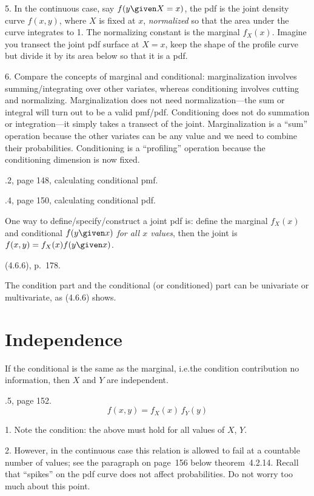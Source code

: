 \documentclass[12pt]{article}
\begin{document}
5. In the continuous case, say $f(y \given X=x)$,
the pdf is the joint density curve $f(x, y)$, where $X$ is fixed at $x$,
\emph{normalized} so that the area under the curve integrates to 1.
The normalizing constant is the marginal $f_X(x)$.
Imagine you transect the joint pdf surface at $X=x$,
keep the shape of the profile curve but divide it by its area below
so that it is a pdf.

6. Compare the concepts of marginal and conditional:
marginalization involves summing/integrating over other variates,
whereas
conditioning involves cutting and normalizing.
Marginalization does not need normalization---the sum or integral will
turn out to be a valid pmf/pdf.
Conditioning does not do summation or integration---it simply takes a
transect of the joint.
Marginalization is a ``sum'' operation because the other variates can be
any value and we need to combine their probabilities.
Conditioning is a ``profiling'' operation because the conditioning
dimension is now fixed.

.2, page 148, calculating conditional pmf.

.4, page 150, calculating conditional pdf.

One way to define/specify/construct a joint pdf is:
define the marginal $f_X(x)$ and conditional $f(y \given x)$
\emph{for all $x$ values}, then the joint is
$f(x,y) = f_X(x) f(y \given x)$.

\alert[Generalization]%
(4.6.6), p.~178.

The condition part and the conditional (or conditioned) part
can be univariate or multivariate, as
(4.6.6) shows.

\section{Independence}

If the conditional is the same as the marginal,
i.e.\@ the condition contribution no information,
then $X$ and $Y$ are independent.

.5, page 152.
\[
f(x, y) = f_X(x)\, f_Y(y)
\]

\alert
1. Note the condition: the above must hold for all values of $X$, $Y$.

2. However, in the continuous case this relation is allowed to fail
at a countable number of values; see the paragraph on page~156 below
theorem~4.2.14.
Recall that ``spikes'' on the pdf curve does not affect probabilities.
Do not worry too much about this point.
\end{document}
